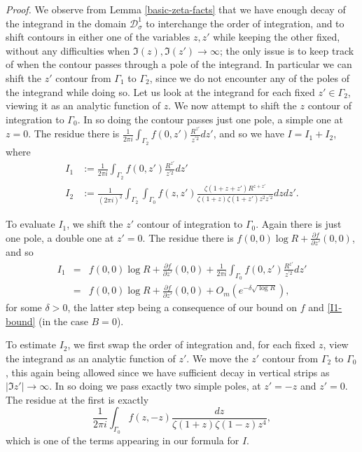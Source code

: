 \documentclass[12pt,a4paper,reqno]{amsart}
\numberwithin{equation}{section}
\theoremstyle{plain}
\theoremstyle{definition}
\def\D{{\mathcal D}}
\def\vs{\vspace{11pt}}
\def\ni{\noindent}
\def\proof{\noindent\textit{Proof. }}
\begin{document}
\proof  We observe from Lemma \ref{basic-zeta-facts} that we have enough decay of the integrand in the domain $\D_\sigma^1$ to interchange the order of integration, and to shift contours in either one of the variables $z,z'$ while keeping the 
other fixed, without any difficulties when $\Im(z), \Im(z') \to \infty$; the only issue is to keep track of when the contour
passes through a pole of the integrand.  
In particular we can shift the $z'$ contour from $\Gamma_1$ to $\Gamma_2$, since we do not
encounter any of the poles of the integrand while doing so. 
Let us look at the integrand for each fixed $z' \in \Gamma_2$, viewing it as an analytic function of $z$.  We now attempt to shift the $z$ contour of integration to $\Gamma_0$.
In so doing the contour passes just one pole, a simple one at $z = 0$. The residue there is $\frac{1}{2\pi i} \int_{\Gamma_2} f(0,z') \frac{R^{z'}}{z^{\prime 2}} dz'$, and so we have $I = I_1 + I_2$, where
\begin{align*}
I_1 &:= \frac{1}{2\pi i} \int_{\Gamma_2} f(0,z') \frac{R^{z'}}{z^{\prime 2}}dz' \\
I_2 &:= \frac{1}{(2\pi i)^2} \int_{\Gamma_2} \int_{\Gamma_0} f(z,z') \frac{\zeta(1 + z + z') R^{z + z'}}{\zeta(1 + z)\zeta(1 + z') z^2 z^{\prime 2}}dz dz'.
\end{align*}

\ni To evaluate $I_1$, we shift the $z'$ contour of integration to $\Gamma_0$. Again there is just one pole, a double one at $z' = 0$. The residue there is $f(0,0)\log R + \frac{\partial f}{\partial z'}(0,0)$, and so 
\begin{eqnarray*}
I_1 & = & f(0,0)\log R + \frac{\partial f}{\partial z'}(0,0) + \frac{1}{2\pi i}\int_{\Gamma_0} f(0,z') \frac{R^{z'}}{z^{\prime 2}} dz' \\ & = & f(0,0)\log R + \frac{\partial f}{\partial z'}(0,0) + O_m(e^{-\delta \sqrt{\log R}}),\end{eqnarray*}
for some $\delta > 0$,
the latter step being a consequence of our bound on $f$ and \eqref{I1-bound} (in the case $B = 0$).\vs

\ni To estimate $I_2$, we first swap the order of integration and, for each fixed $z$, view the integrand as an analytic function of $z'$. We move the $z'$ contour from $\Gamma_2$ to $\Gamma_0$, this again being allowed since we have sufficient decay in vertical strips as $|\Im z'| \rightarrow \infty$. In so doing we pass exactly two simple poles, at $z' = -z$ and $z' = 0$. The residue at the first is exactly 
\[ \frac{1}{2\pi i} \int_{\Gamma_0} f(z,-z) \frac{dz}{\zeta(1 + z)\zeta(1 - z)z^4},\] which is one of the terms appearing in our formula for $I$.\vs
\end{document}
